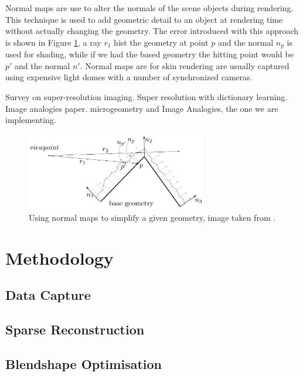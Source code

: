 \documentclass[11pt]{report}
\begin{document}
Normal maps are use to alter the normals of the scene objects during rendering.
This technique is used to add geometric detail to an object at rendering time without actually changing the geometry.
The error introduced with this approach is shown in Figure \ref{fig:normal_map}, a ray $r_1$ hist the geometry at point $p$ and the normal $n_p$ is used for shading, while if we had the based geometry the hitting point would be $p'$ and the normal $n'$.
Normal maps are for skin rendering are usually captured using expensive light domes with a number of synchronized cameras. 

\cite{Tian2011} Survey on super-resolution imaging.
\cite{Jianchao2010} Super resolution with dictionary learning.
\cite{Hertzmann2001} Image analogies paper.
\cite{Graham2013} microgeometry and Image Analogies, the one we are implementing.

\begin{figure}[htbp!]
\centering
\includegraphics[width=0.7\textwidth]{img/normal_map}
	\caption{ Using normal maps to simplify a given geometry, image taken from \cite{ganovelli2014}.}
	\label{fig:normal_map}
\end{figure}



\chapter{Methodology}
\label{sec:methods}


\section{Data Capture}


\section{Sparse Reconstruction}


\section{Blendshape Optimisation}
\end{document}
